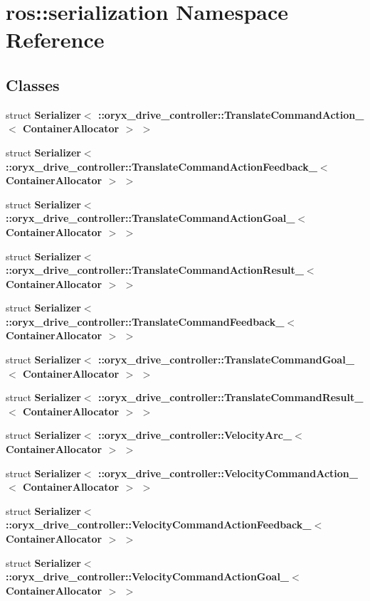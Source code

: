\section{ros\-:\-:serialization \-Namespace \-Reference}
\label{namespaceros_1_1serialization}
\subsection*{\-Classes}
\begin{DoxyCompactItemize}
\item 
struct {\bf \-Serializer$<$ \-::oryx\-\_\-drive\-\_\-controller\-::\-Translate\-Command\-Action\-\_\-$<$ Container\-Allocator $>$ $>$}
\item 
struct {\bf \-Serializer$<$ \-::oryx\-\_\-drive\-\_\-controller\-::\-Translate\-Command\-Action\-Feedback\-\_\-$<$ Container\-Allocator $>$ $>$}
\item 
struct {\bf \-Serializer$<$ \-::oryx\-\_\-drive\-\_\-controller\-::\-Translate\-Command\-Action\-Goal\-\_\-$<$ Container\-Allocator $>$ $>$}
\item 
struct {\bf \-Serializer$<$ \-::oryx\-\_\-drive\-\_\-controller\-::\-Translate\-Command\-Action\-Result\-\_\-$<$ Container\-Allocator $>$ $>$}
\item 
struct {\bf \-Serializer$<$ \-::oryx\-\_\-drive\-\_\-controller\-::\-Translate\-Command\-Feedback\-\_\-$<$ Container\-Allocator $>$ $>$}
\item 
struct {\bf \-Serializer$<$ \-::oryx\-\_\-drive\-\_\-controller\-::\-Translate\-Command\-Goal\-\_\-$<$ Container\-Allocator $>$ $>$}
\item 
struct {\bf \-Serializer$<$ \-::oryx\-\_\-drive\-\_\-controller\-::\-Translate\-Command\-Result\-\_\-$<$ Container\-Allocator $>$ $>$}
\item 
struct {\bf \-Serializer$<$ \-::oryx\-\_\-drive\-\_\-controller\-::\-Velocity\-Arc\-\_\-$<$ Container\-Allocator $>$ $>$}
\item 
struct {\bf \-Serializer$<$ \-::oryx\-\_\-drive\-\_\-controller\-::\-Velocity\-Command\-Action\-\_\-$<$ Container\-Allocator $>$ $>$}
\item 
struct {\bf \-Serializer$<$ \-::oryx\-\_\-drive\-\_\-controller\-::\-Velocity\-Command\-Action\-Feedback\-\_\-$<$ Container\-Allocator $>$ $>$}
\item 
struct {\bf \-Serializer$<$ \-::oryx\-\_\-drive\-\_\-controller\-::\-Velocity\-Command\-Action\-Goal\-\_\-$<$ Container\-Allocator $>$ $>$}
\item 

\end{DoxyCompactItemize}

